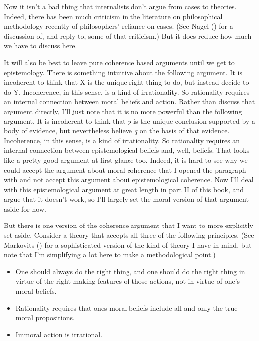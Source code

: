 \documentclass[
  10pt,
  letterpaper,
  twoside]{scrbook}
\providecommand{\tightlist}{%
  \setlength{\itemsep}{0pt}\setlength{\parskip}{0pt}}\usepackage{longtable,booktabs,array}
\begin{document}
Now it isn't a bad thing that internalists don't argue from cases to
theories. Indeed, there has been much criticism in the literature on
philosophical methodology recently of philosophers' reliance on cases.
(See Nagel () for a discussion of, and
reply to, some of that criticism.) But it does reduce how much we have
to discuss here.

It will also be best to leave pure coherence based arguments until we
get to epistemology. There is something intuitive about the following
argument. It is incoherent to think that X is the unique right thing to
do, but instead decide to do Y. Incoherence, in this sense, is a kind of
irrationality. So rationality requires an internal connection between
moral beliefs and action. Rather than discuss that argument directly,
I'll just note that it is no more powerful than the following argument.
It is incoherent to think that \emph{p} is the unique conclusion
supported by a body of evidence, but nevertheless believe \emph{q} on
the basis of that evidence. Incoherence, in this sense, is a kind of
irrationality. So rationality requires an internal connection between
epistemological beliefs and, well, beliefs. That looks like a pretty
good argument at first glance too. Indeed, it is hard to see why we
could accept the argument about moral coherence that I opened the
paragraph with and not accept this argument about epistemological
coherence. Now I'll deal with this epistemological argument at great
length in part II of this book, and argue that it doesn't work, so I'll
largely set the moral version of that argument aside for now.

But there is one version of the coherence argument that I want to more
explicitly set aside. Consider a theory that accepts all three of the
following principles. (See Markovits
() for a sophisticated version of the
kind of theory I have in mind, but note that I'm simplifying a lot here
to make a methodological point.)

\begin{itemize}
\tightlist
\item
  One should always do the right thing, and one should do the right
  thing in virtue of the right-making features of those actions, not in
  virtue of one's moral beliefs.
\item
  Rationality requires that ones moral beliefs include all and only the
  true moral propositions.
\item
  Immoral action is irrational.
\end{itemize}
\end{document}
